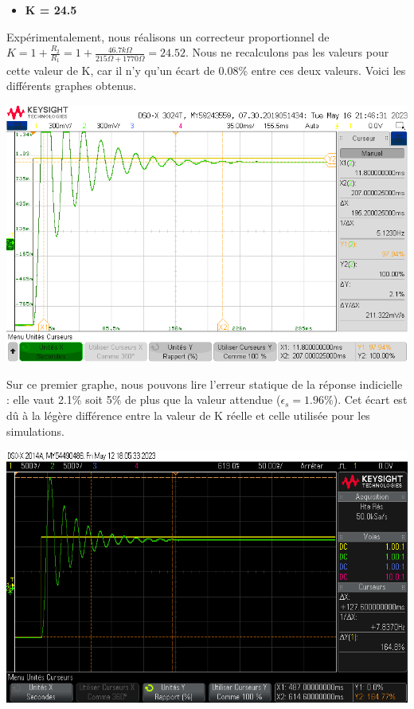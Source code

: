 \documentclass[12pt]{article}
\begin{document}
\begin{itemize}
    \item \bf \large K = 24.5
\end{itemize}
Expérimentalement, nous réalisons un correcteur proportionnel de $K = 1 + \frac{R_2}{R_1} = 1 + \frac{46.7 k\Omega}{215\Omega + 1770\Omega} = 24.52$. Nous ne recalculons pas les valeurs pour cette valeur de K, car il n'y qu'un écart de 0.08$\%$ entre ces deux valeurs.
Voici les différents graphes obtenus.
\begin{center}
    \includegraphics[width = 16 cm]{TP3/Syst_2/P/estat-syst2-k24,5.png}
\end{center}
Sur ce premier graphe, nous pouvons lire l'erreur statique de la réponse indicielle : elle vaut 2.1$\%$ soit 5$\%$ de plus que la valeur attendue ($\epsilon_s = 1.96\%$). Cet écart est dû à la légère différence entre la valeur de K réelle et celle utilisée pour les simulations.
\begin{center}
    \includegraphics[width = 16 cm]{TP3/Syst_2/P/k24_5_syst2_dep_.png}
\end{center}
\end{document}
